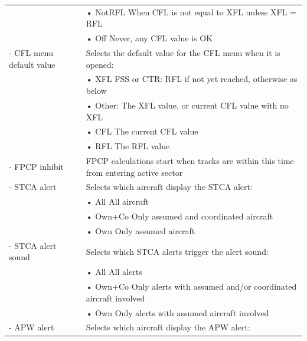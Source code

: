 \documentclass[11pt,a4paper]{memoir}
\begin{document}
\begin{tabular}{p{5cm} p{9cm}}
                          & \hspace{10pt}• NotRFL When CFL is not equal to XFL unless XFL = RFL\\
                          & \hspace{10pt}• Off Never, any CFL value is OK\\
- CFL menu default value  & Selects the default value for the CFL menu when it is opened:\\
                          & \hspace{10pt}• XFL FSS or CTR: RFL if not yet reached, otherwise as below\\
                          & \hspace{10pt}• Other: The XFL value, or current CFL value with no XFL\\
                          & \hspace{10pt}• CFL The current CFL value\\
                          & \hspace{10pt}• RFL The RFL value\\
- FPCP inhibit            & FPCP calculations start when tracks are within this time from entering active sector\\
- STCA alert              & Selects which aircraft display the STCA alert:\\
                          & \hspace{10pt}• All All aircraft\\
                          & \hspace{10pt}• Own+Co Only assumed and coordinated aircraft\\
                          & \hspace{10pt}• Own Only assumed aircraft\\
- STCA alert sound        & Selects which STCA alerts trigger the alert sound:\\
                          & \hspace{10pt}• All All alerts\\
                          & \hspace{10pt}• Own+Co Only alerts with assumed and/or coordinated aircraft involved\\
                          & \hspace{10pt}• Own Only alerts with assumed aircraft involved\\
- APW alert               & Selects which aircraft display the APW alert:\\

\end{tabular}
\end{document}
